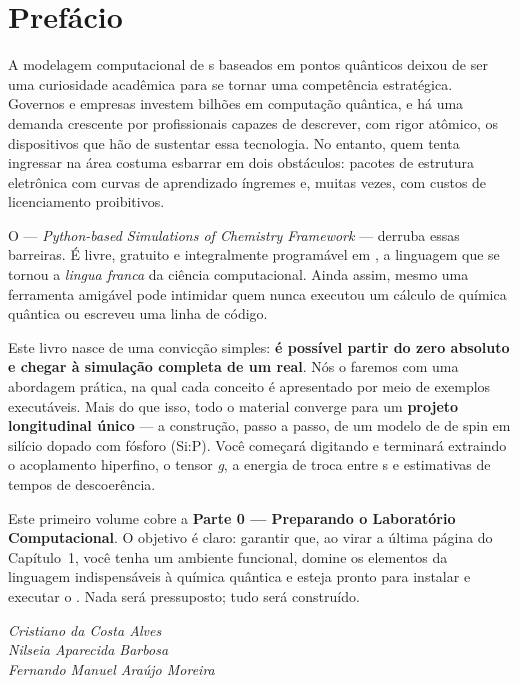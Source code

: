 \chapter*{Prefácio}

A modelagem computacional de \qubit{}s baseados em pontos quânticos deixou de
ser uma curiosidade acadêmica para se tornar uma competência estratégica.
Governos e empresas investem bilhões em computação quântica, e há uma demanda
crescente por profissionais capazes de descrever, com rigor atômico, os
dispositivos que hão de sustentar essa tecnologia. No entanto, quem tenta
ingressar na área costuma esbarrar em dois obstáculos: pacotes de estrutura
eletrônica com curvas de aprendizado íngremes e, muitas vezes, com custos de
licenciamento proibitivos.

O \pyscf{} --- \emph{Python-based Simulations of Chemistry Framework} --- derruba
essas barreiras. É livre, gratuito e integralmente programável em \python{}, a
linguagem que se tornou a \emph{lingua franca} da ciência computacional. Ainda
assim, mesmo uma ferramenta amigável pode intimidar quem nunca executou um
cálculo de química quântica ou escreveu uma linha de código.

Este livro nasce de uma convicção simples: \textbf{é possível partir do zero
absoluto e chegar à simulação completa de um \qubit{} real}. Nós o faremos com
uma abordagem prática, na qual cada conceito é apresentado por meio de exemplos
executáveis. Mais do que isso, todo o material converge para um \textbf{projeto
longitudinal único} --- a construção, passo a passo, de um modelo de \qubit{} de
spin em silício dopado com fósforo (Si:P). Você começará digitando
 e terminará extraindo o acoplamento hiperfino, o tensor
\emph{g}, a energia de troca entre \qubit{}s e estimativas de tempos de
descoerência.

Este primeiro volume cobre a \textbf{Parte 0 --- Preparando o Laboratório
Computacional}. O objetivo é claro: garantir que, ao virar a última página do
Capítulo~1, você tenha um ambiente \python{} funcional, domine os elementos da
linguagem indispensáveis à química quântica e esteja pronto para instalar e
executar o \pyscf{}. Nada será pressuposto; tudo será construído.

\begin{flushright}
\itshape Cristiano da Costa Alves\\
Nilseia Aparecida Barbosa\\
Fernando Manuel Araújo Moreira
\end{flushright}
